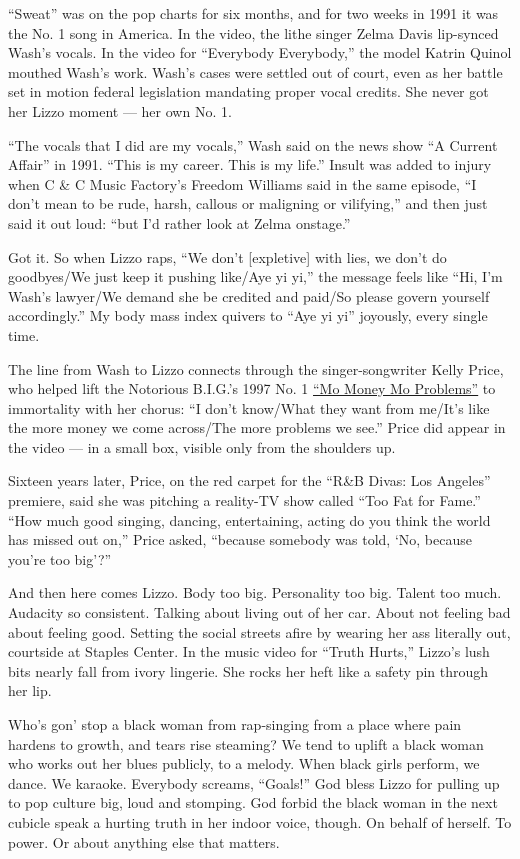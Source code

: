 ``Sweat'' was on the pop charts for six months, and for two weeks in
1991 it was the No. 1 song in America. In the video, the lithe singer
Zelma Davis lip-synced Wash's vocals. In the video for ``Everybody
Everybody,'' the model Katrin Quinol mouthed Wash's work. Wash's cases
were settled out of court, even as her battle set in motion federal
legislation mandating proper vocal credits. She never got her Lizzo
moment --- her own No. 1.

``The vocals that I did are my vocals,'' Wash said on the news show ``A
Current Affair'' in 1991. ``This is my career. This is my life.'' Insult
was added to injury when C \& C Music Factory's Freedom Williams said in
the same episode, ``I don't mean to be rude, harsh, callous or maligning
or vilifying,'' and then just said it out loud: ``but I'd rather look at
Zelma onstage.''

Got it. So when Lizzo raps, ``We don't {[}expletive{]} with lies, we
don't do goodbyes/We just keep it pushing like/Aye yi yi,'' the message
feels like ``Hi, I'm Wash's lawyer/We demand she be credited and paid/So
please govern yourself accordingly.'' My body mass index quivers to
``Aye yi yi'' joyously, every single time.

The line from Wash to Lizzo connects through the singer-songwriter Kelly
Price, who helped lift the Notorious B.I.G.'s 1997 No. 1
\href{https://www.youtube.com/watch?v=gUhRKVIjJtw}{``Mo Money Mo
Problems''} to immortality with her chorus: ``I don't know/What they
want from me/It's like the more money we come across/The more problems
we see.'' Price did appear in the video --- in a small box, visible only
from the shoulders up.

Sixteen years later, Price, on the red carpet for the ``R\&B Divas: Los
Angeles'' premiere, said she was pitching a reality-TV show called ``Too
Fat for Fame.'' ``How much good singing, dancing, entertaining, acting
do you think the world has missed out on,'' Price asked, ``because
somebody was told, `No, because you're too big'?''

And then here comes Lizzo. Body too big. Personality too big. Talent too
much. Audacity so consistent. Talking about living out of her car. About
not feeling bad about feeling good. Setting the social streets afire by
wearing her ass literally out, courtside at Staples Center. In the music
video for ``Truth Hurts,'' Lizzo's lush bits nearly fall from ivory
lingerie. She rocks her heft like a safety pin through her lip.

Who's gon' stop a black woman from rap-singing from a place where pain
hardens to growth, and tears rise steaming? We tend to uplift a black
woman who works out her blues publicly, to a melody. When black girls
perform, we dance. We karaoke. Everybody screams, ``Goals!'' God bless
Lizzo for pulling up to pop culture big, loud and stomping. God forbid
the black woman in the next cubicle speak a hurting truth in her indoor
voice, though. On behalf of herself. To power. Or about anything else
that matters.

